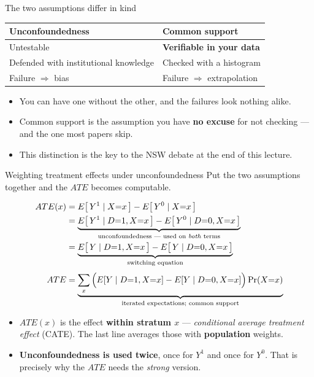 \documentclass[
  11pt,
  ignorenonframetext,
  aspectratio=169,
]{beamer}
\providecommand{\tightlist}{%
  \setlength{\itemsep}{0pt}\setlength{\parskip}{0pt}}
\begin{document}
\begin{frame}{The two assumptions differ in kind}
\protect{}\label{the-two-assumptions-differ-in-kind}
\begin{center}
\begin{tabular}{ll}
\toprule
\textbf{Unconfoundedness} & \textbf{Common support} \\
\midrule
Untestable & \textbf{Verifiable in your data} \\
Defended with institutional knowledge & Checked with a histogram \\
Failure $\Rightarrow$ bias & Failure $\Rightarrow$ extrapolation \\
\bottomrule
\end{tabular}
\end{center}

\vspace{0.4em}

\begin{itemize}
\tightlist
\item
  You can have one without the other, and the failures look nothing
  alike.
\item
  Common support is the assumption you have \textbf{no excuse} for not
  checking --- and the one most papers skip.
\item
  This distinction is the key to the NSW debate at the end of this
  lecture.
\end{itemize}
\end{frame}

\begin{frame}{Weighting treatment effects under unconfoundedness}
\protect{}\label{weighting-treatment-effects-under-unconfoundedness}
Put the two assumptions together and the \(ATE\) becomes computable.

\[
\begin{aligned}
ATE(x) &= E\big[\,Y^1 \mid X{=}x\,\big] - E\big[\,Y^0 \mid X{=}x\,\big] \\
       &= \underbrace{E\big[\,Y^1 \mid D{=}1, X{=}x\,\big] - E\big[\,Y^0 \mid D{=}0, X{=}x\,\big]}_{\text{unconfoundedness --- used on \emph{both} terms}} \\
       &= \underbrace{E\big[\,Y \mid D{=}1, X{=}x\,\big] - E\big[\,Y \mid D{=}0, X{=}x\,\big]}_{\text{switching equation}} \\[0.3em]
ATE    &= \underbrace{\sum_x \Big( E[Y \mid D{=}1, X{=}x] - E[Y \mid D{=}0, X{=}x] \Big)\Pr(X{=}x)}_{\text{iterated expectations; common support}}
\end{aligned}
\]

\begin{itemize}
\tightlist
\item
  \(ATE(x)\) is the effect \textbf{within stratum \(x\)} ---
  \emph{conditional average treatment effect} (CATE). The last line
  averages those with \textbf{population} weights.
\item
  \textbf{Unconfoundedness is used twice}, once for \(Y^1\) and once for
  \(Y^0\). That is precisely why the \(ATE\) needs the \emph{strong}
  version.
\end{itemize}
\end{frame}
\end{document}
